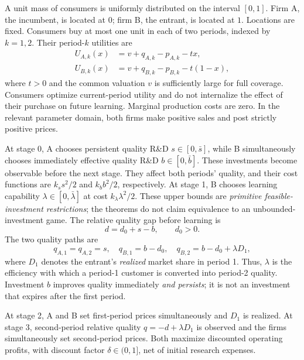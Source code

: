 \documentclass[11pt,a4paper]{article}
\numberwithin{equation}{section}
\theoremstyle{remark}
\newcommand{\kl}{k_{\lambda}}
\begin{document}
A unit mass of consumers is uniformly distributed on the interval $[0,1]$. Firm A, the incumbent, is located at $0$; firm B, the entrant, is located at $1$. Locations are fixed. Consumers buy at most one unit in each of two periods, indexed by $k=1,2$. Their period-$k$ utilities are
\begin{align}
 U_{A,k}(x)&=v+q_{A,k}-p_{A,k}-tx, \label{eq:ua}\\
 U_{B,k}(x)&=v+q_{B,k}-p_{B,k}-t(1-x), \label{eq:ub}
\end{align}
where $t>0$ and the common valuation $v$ is sufficiently large for full coverage. Consumers optimize current-period utility and do not internalize the effect of their purchase on future learning. Marginal production costs are zero. In the relevant parameter domain, both firms make positive sales and post strictly positive prices.

At stage 0, A chooses persistent quality R\&D $s\in[0,\bar s]$, while B simultaneously chooses immediately effective quality R\&D $b\in[0,\bar b]$. These investments become observable before the next stage. They affect both periods' quality, and their cost functions are $k_s s^2/2$ and $k_b b^2/2$, respectively. At stage 1, B chooses learning capability $\lambda\in[0,\bar\lambda]$ at cost $\kl\lambda^2/2$. These upper bounds are \emph{primitive feasible-investment restrictions}; the theorems do not claim equivalence to an unbounded-investment game. The relative quality gap before learning is
\begin{equation}
 d=d_0+s-b,\qquad d_0>0. \label{eq:d}
\end{equation}
The two quality paths are
\begin{equation}
 q_{A,1}=q_{A,2}=s,\quad
 q_{B,1}=b-d_0,\quad q_{B,2}=b-d_0+\lambda D_1,  \label{eq:technology}
\end{equation}
where $D_1$ denotes the entrant's \emph{realized} market share in period 1. Thus, $\lambda$ is the efficiency with which a period-1 customer is converted into period-2 quality. Investment $b$ improves quality immediately \emph{and persists}; it is not an investment that expires after the first period.

At stage 2, A and B set first-period prices simultaneously and $D_1$ is realized. At stage 3, second-period relative quality $q=-d+\lambda D_1$ is observed and the firms simultaneously set second-period prices. Both maximize discounted operating profits, with discount factor $\delta\in(0,1]$, net of initial research expenses.
\end{document}
